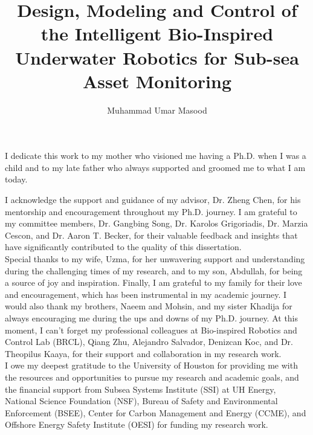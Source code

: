 \documentclass{uhcoethesis}
\title{Design, Modeling and Control of the Intelligent Bio-Inspired Underwater Robotics for Sub-sea Asset Monitoring}
\author{Muhammad Umar Masood}
\begin{document}
\frontmatter
\maketitlepage
\makecopyrightpage

\begin{dedication}
I dedicate this work to my mother who visioned me having a Ph.D. when I was a child and to my late father who always supported and groomed me to what I am today.
\end{dedication}

\begin{acknowledgements}
I acknowledge the support and guidance of my advisor, Dr. Zheng Chen, for his mentorship and encouragement throughout my Ph.D. journey. I am grateful to my committee members, Dr. Gangbing Song, Dr. Karolos Grigoriadis, Dr. Marzia Cescon, and Dr. Aaron T. Becker, for their valuable feedback and insights that have significantly contributed to the quality of this dissertation.\\
Special thanks to my wife, Uzma, for her unwavering support and understanding during the challenging times of my research, and to my son, Abdullah, for being a source of joy and inspiration. Finally, I am grateful to my family for their love and encouragement, which has been instrumental in my academic journey. I would also thank my brothers, Naeem and Mohsin, and my sister Khadija for always encouraging me during the ups and downs of my Ph.D. journey. At this moment, I can't forget my professional colleagues at Bio-inspired Robotics and Control Lab (BRCL), Qiang Zhu, Alejandro Salvador, Denizcan Koc, and Dr. Theopilus Kaaya, for their support and collaboration in my research work.\\
I owe my deepest gratitude to the University of Houston for providing me with the resources and opportunities to pursue my research and academic goals, and the financial support from Subsea Systems Institute (SSI) at UH Energy, National Science Foundation (NSF), Bureau of Safety and Environmental Enforcement (BSEE), Center for Carbon Management and Energy (CCME), and Offshore Energy Safety Institute (OESI) for funding my research work.
\end{acknowledgements}
\end{document}
